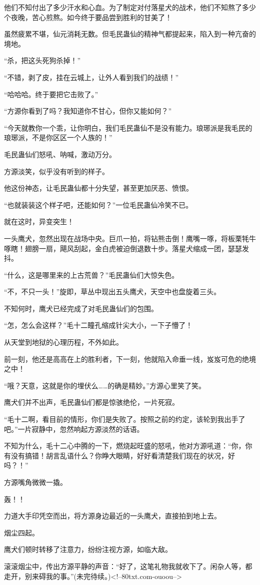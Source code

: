 \begin{this_body}
他们不知付出了多少汗水和心血。为了制定对付落星犬的战术，他们不知熬了多少个夜晚，苦心煎熬。如今终于要品尝到胜利的甘美了！

虽然疲累不堪，仙元消耗无数。但毛民蛊仙的精神气都提起来，陷入到一种亢奋的境地。

“杀，把这头死狗杀掉！”

“不错，剥了皮，挂在云城上，让外人看到我们的战绩！”

“哈哈哈。终于要把它击败了。”

“方源你看到了吗？我知道你不甘心，但你又能如何？”

“今天就教你一个乖，让你明白，我们毛民蛊仙不是没有能力。琅琊派是我毛民的琅琊派，不是你区区一个人族的！”

毛民蛊仙们怒吼、呐喊，激动万分。

方源淡笑，似乎没有听到的样子。

他这份神态，让毛民蛊仙都十分失望，甚至更加厌恶、愤恨。

“也就装装这个样子吧，还能如何？”一位毛民蛊仙冷笑不已。

就在这时，异变突生！

一头鹰犬，忽然出现在战场中央。巨爪一拍，将钻熊击倒！鹰嘴一啄，将板栗牦牛啄瞎！翅膀一扇，飓风刮起，金白虎被迫倒退数十步。落星犬缩成一团，瑟瑟发抖。

“什么，这是哪里来的上古荒兽？”毛民蛊仙们大惊失色。

“不，不只一头！”旋即，草丛中现出五头鹰犬，天空中也盘旋着三头。

不知何时，鹰犬已经完成了对毛民蛊仙们的包围。

“怎，怎么会这样？”毛十二瞳孔缩成针尖大小，一下子懵了！

从天堂到地狱的心理历程，不外如此。

前一刻，他还是高高在上的胜利者，下一刻，他就陷入命垂一线，岌岌可危的绝境之中！

“哦？天意，这就是你的埋伏么……的确是精妙。”方源心里笑了笑。

鹰犬们并不出声，毛民蛊仙们都是惊骇绝伦，一片死寂。

“毛十二啊，看目前的情形，你们是失败了。按照之前的约定，该轮到我出手了吧。”一片寂静中，忽然响起方源淡然的话语。

不知为什么，毛十二心中腾的一下，燃烧起旺盛的怒吼，他对方源吼道：“你，你有没有搞错！胡言乱语什么？你睁大眼睛，好好看清楚我们现在的状况，好吗？！”

方源嘴角微微一撬。

轰！！

力道大手印凭空而出，将方源身边最近的一头鹰犬，直接拍到地上去。

烟尘四起。

鹰犬们顿时转移了注意力，纷纷注视方源，如临大敌。

滚滚烟尘中，传出方源平静的声音：“好了，这笔礼物我就收下了。闲杂人等，都走开，别来碍我的事。”(未完待续。)<!--80txt.com-ouoou-->

\end{this_body}

